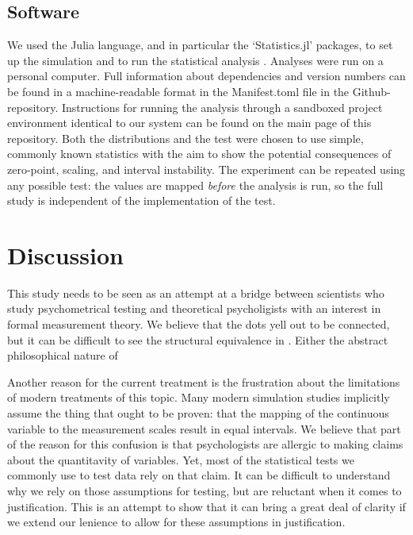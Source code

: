 \documentclass[utf8]{FrontiersinVancouver}
\begin{document}
\subsection{Software}
We used the Julia language, and in particular the `Statistics.jl' packages, to set up the simulation and to run the statistical analysis \citep{bezanson2017julia}. Analyses were run on a personal computer.  Full information about dependencies and version numbers can be found in a machine-readable format in the Manifest.toml file in the Github-repository. Instructions for running the analysis through a sandboxed project environment identical to our system can be found on the main page of this repository. Both the distributions and the test were chosen to use simple, commonly known statistics with the aim to show the potential consequences of zero-point, scaling, and interval instability. The experiment can be repeated using any possible test: the values are mapped \textit{before} the analysis is run, so the full study is independent of the implementation of the test.



\section{Discussion}

This study needs to be seen as an attempt at a bridge between scientists who study psychometrical testing and theoretical psycholigists with an interest in formal measurement theory. We believe that the dots yell out to be connected, but it can be difficult to see the structural equivalence in . Either the abstract philosophical nature of  


Another reason for the current treatment is the frustration about the limitations of modern treatments of this topic. Many modern simulation studies implicitly assume the thing that ought to be proven: that the mapping of the continuous variable to the measurement scales result in equal intervals. We believe that part of the reason for this confusion is that psychologists are allergic to making claims about the quantitavity of variables. Yet, most of the statistical tests we commonly use to test data rely on that claim. It can be difficult to understand why we rely on those assumptions for testing, but are reluctant when it comes to justification. This is an attempt to show that it can bring a great deal of clarity if we extend our lenience to allow for these assumptions in justification.
\end{document}
